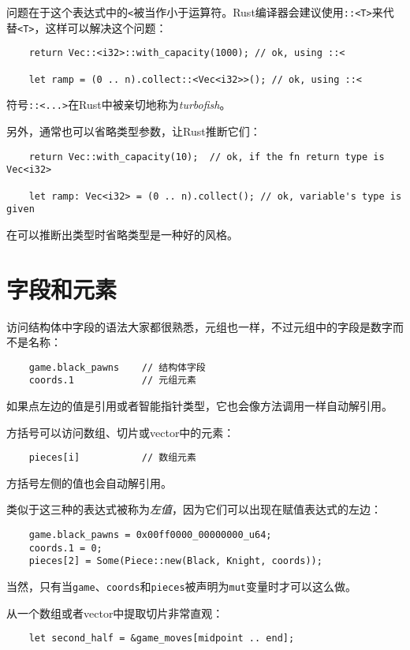 问题在于这个表达式中的\texttt{<}被当作小于运算符。Rust编译器会建议使用\texttt{::<T>}来代替\texttt{<T>}，这样可以解决这个问题：
\begin{verbatim}
    return Vec::<i32>::with_capacity(1000); // ok, using ::<

    let ramp = (0 .. n).collect::<Vec<i32>>(); // ok, using ::<
\end{verbatim}

符号\texttt{::<...>}在Rust中被亲切地称为\emph{turbofish}。

另外，通常也可以省略类型参数，让Rust推断它们：
\begin{verbatim}
    return Vec::with_capacity(10);  // ok, if the fn return type is Vec<i32>

    let ramp: Vec<i32> = (0 .. n).collect(); // ok, variable's type is given
\end{verbatim}

在可以推断出类型时省略类型是一种好的风格。

\section{字段和元素}

访问结构体中字段的语法大家都很熟悉，元组也一样，不过元组中的字段是数字而不是名称：
\begin{verbatim}
    game.black_pawns    // 结构体字段
    coords.1            // 元组元素
\end{verbatim}

如果点左边的值是引用或者智能指针类型，它也会像方法调用一样自动解引用。

方括号可以访问数组、切片或vector中的元素：
\begin{verbatim}
    pieces[i]           // 数组元素
\end{verbatim}

方括号左侧的值也会自动解引用。

类似于这三种的表达式被称为\emph{左值}，因为它们可以出现在赋值表达式的左边：
\begin{verbatim}
    game.black_pawns = 0x00ff0000_00000000_u64;
    coords.1 = 0;
    pieces[2] = Some(Piece::new(Black, Knight, coords));
\end{verbatim}

当然，只有当\texttt{game}、\texttt{coords}和\texttt{pieces}被声明为\texttt{mut}变量时才可以这么做。

从一个数组或者vector中提取切片非常直观：
\begin{verbatim}
    let second_half = &game_moves[midpoint .. end];
\end{verbatim}

